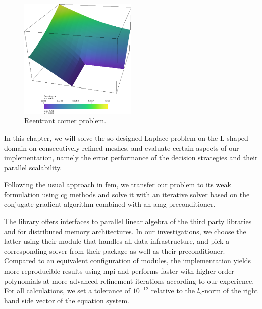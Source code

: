 \begin{figure}
\centering
\includegraphics[width=0.5\textwidth]{figures/results/solution.png}
\caption{Reentrant corner problem.}
\label{fig:solution}
\end{figure}

In this chapter, we will solve the so designed Laplace problem on the L-shaped domain on consecutively refined meshes, and evaluate certain aspects of our implementation, namely the error performance of the decision strategies and their parallel scalability.

Following the usual approach in \gls{fem}, we transfer our problem to its weak formulation using \gls{cg} methods and solve it with an iterative solver based on the conjugate gradient algorithm combined with an \gls{amg} preconditioner.

The \dealii{} library offers interfaces to parallel linear algebra of the third party libraries \petsc{} \textcite{petsc3124} and \trilinos{} \textcite{trilinos12181} for distributed memory architectures. In our investigations, we choose the latter using their \epetra{}
module that handles all data infrastructure, and pick a corresponding solver from their \aztecoo{}
package as well as their \ml{}
preconditioner. Compared to an equivalent configuration of \petsc{} modules, the \trilinos{} implementation yields more reproducible results using \gls{mpi} \parencite[FAQ]{petsc3124} and performs faster with higher order polynomials at more advanced refinement iterations according to our experience. For all calculations, we set a tolerance of $10^{-12}$ relative to the $l_2$-norm of the right hand side vector of the equation system.





